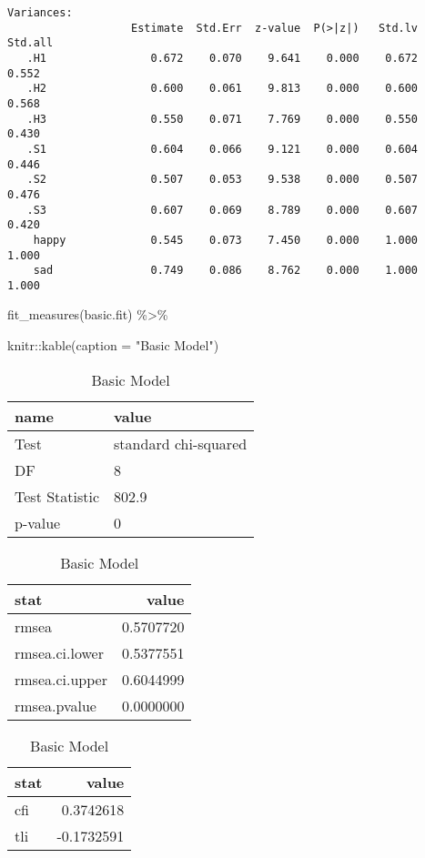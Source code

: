 \documentclass[
  letterpaper,
  DIV=11,
  numbers=noendperiod]{scrreprt}
\newenvironment{Shaded}{\begin{snugshade}}{\end{snugshade}}
\newcommand{\AttributeTok}[1]{\textcolor[rgb]{0.40,0.45,0.13}{#1}}
\newcommand{\FunctionTok}[1]{\textcolor[rgb]{0.28,0.35,0.67}{#1}}
\newcommand{\NormalTok}[1]{\textcolor[rgb]{0.00,0.23,0.31}{#1}}
\newcommand{\SpecialCharTok}[1]{\textcolor[rgb]{0.37,0.37,0.37}{#1}}
\newcommand{\StringTok}[1]{\textcolor[rgb]{0.13,0.47,0.30}{#1}}
\begin{document}
\begin{verbatim}
Variances:
                   Estimate  Std.Err  z-value  P(>|z|)   Std.lv  Std.all
   .H1                0.672    0.070    9.641    0.000    0.672    0.552
   .H2                0.600    0.061    9.813    0.000    0.600    0.568
   .H3                0.550    0.071    7.769    0.000    0.550    0.430
   .S1                0.604    0.066    9.121    0.000    0.604    0.446
   .S2                0.507    0.053    9.538    0.000    0.507    0.476
   .S3                0.607    0.069    8.789    0.000    0.607    0.420
    happy             0.545    0.073    7.450    0.000    1.000    1.000
    sad               0.749    0.086    8.762    0.000    1.000    1.000
\end{verbatim}

\begin{Shaded}
\begin{Highlighting}[]
\FunctionTok{fit\_measures}\NormalTok{(basic.fit) }\SpecialCharTok{\%\textgreater{}\%} 
  
\NormalTok{  knitr}\SpecialCharTok{::}\FunctionTok{kable}\NormalTok{(}\AttributeTok{caption =} \StringTok{"Basic Model"}\NormalTok{)}
\end{Highlighting}
\end{Shaded}

\begin{table}
\caption{Basic Model}

\centering
\begin{tabular}[t]{l|l}
\hline
name & value\\
\hline
Test & standard chi-squared\\
\hline
DF & 8\\
\hline
Test Statistic & 802.9\\
\hline
p-value & 0\\
\hline
\end{tabular}
\centering
\begin{tabular}[t]{l|r}
\hline
stat & value\\
\hline
rmsea & 0.5707720\\
\hline
rmsea.ci.lower & 0.5377551\\
\hline
rmsea.ci.upper & 0.6044999\\
\hline
rmsea.pvalue & 0.0000000\\
\hline
\end{tabular}
\centering
\begin{tabular}[t]{l|r}
\hline
stat & value\\
\hline
cfi & 0.3742618\\
\hline
tli & -0.1732591\\
\hline
\end{tabular}
\end{table}
\end{document}
